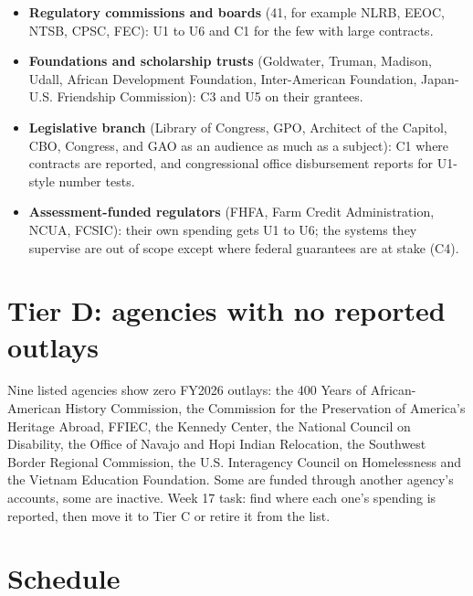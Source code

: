 \documentclass[letterpaper,11pt]{article}
\providecommand{\tightlist}{\setlength{\itemsep}{0pt}\setlength{\parskip}{0pt}}
\begin{document}
\begin{itemize}
\tightlist
\item
  \textbf{Regulatory commissions and boards} (41, for example NLRB,
  EEOC, NTSB, CPSC, FEC): U1 to U6 and C1 for the few with large
  contracts.
\item
  \textbf{Foundations and scholarship trusts} (Goldwater, Truman,
  Madison, Udall, African Development Foundation, Inter-American
  Foundation, Japan-U.S. Friendship Commission): C3 and U5 on their
  grantees.
\item
  \textbf{Legislative branch} (Library of Congress, GPO, Architect of
  the Capitol, CBO, Congress, and GAO as an audience as much as a
  subject): C1 where contracts are reported, and congressional office
  disbursement reports for U1-style number tests.
\item
  \textbf{Assessment-funded regulators} (FHFA, Farm Credit
  Administration, NCUA, FCSIC): their own spending gets U1 to U6; the
  systems they supervise are out of scope except where federal
  guarantees are at stake (C4).
\end{itemize}

\hypertarget{tier-d-agencies-with-no-reported-outlays}{%
\section{Tier D: agencies with no reported
outlays}\label{tier-d-agencies-with-no-reported-outlays}}

Nine listed agencies show zero FY2026 outlays: the 400 Years of
African-American History Commission, the Commission for the Preservation
of America's Heritage Abroad, FFIEC, the Kennedy Center, the National
Council on Disability, the Office of Navajo and Hopi Indian Relocation,
the Southwest Border Regional Commission, the U.S. Interagency Council
on Homelessness and the Vietnam Education Foundation. Some are funded
through another agency's accounts, some are inactive. Week 17 task: find
where each one's spending is reported, then move it to Tier C or retire
it from the list.

\hypertarget{schedule}{%
\section{Schedule}\label{schedule}}
\end{document}
